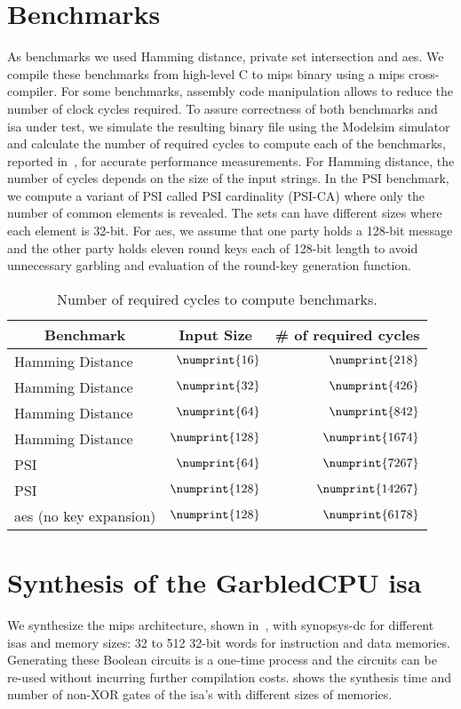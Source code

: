 \section{Benchmarks}\label{ssect:bench}
As benchmarks we used Hamming distance, private set intersection and \acrshort{aes}. We compile these benchmarks from high-level C to \gls{mips} binary using a \gls{mips} cross-compiler. For some benchmarks, assembly code manipulation allows to reduce the number of clock cycles required. To assure correctness of both benchmarks and \acrshort{isa} under test, we simulate the resulting binary file using the Modelsim simulator and calculate the number of required cycles to compute each of the benchmarks, reported in~, for accurate performance measurements. For Hamming distance, the number of cycles depends on the size of the input strings. In the PSI benchmark, we compute a variant of PSI called PSI cardinality (PSI-CA) where only the number of common elements is revealed. The sets can have different sizes where each element is 32-bit.  For \acrshort{aes}, we assume that one party holds a 128-bit message and the other party holds eleven round keys each of 128-bit length to avoid unnecessary garbling and evaluation of the round-key generation function.

\begin{table}[ht]
\caption{Number of required cycles to compute benchmarks.}\label{tab:cyc_bench}
\centering
\small
\begin{tabular}{l|r|r}
\multicolumn{1}{c|}{Benchmark} & \multicolumn{1}{c|}{Input Size} &  \multicolumn{1}{c}{\# of required cycles} \\
\hline
\hline
Hamming Distance & $\numprint{16}$ & $\numprint{218}$\\
\hline
 Hamming Distance & $\numprint{32}$ & $\numprint{426}$\\
\hline
Hamming Distance & $\numprint{64}$ & $\numprint{842}$\\
\hline
Hamming Distance & $\numprint{128}$ & $\numprint{1674}$\\
\hline
PSI & $\numprint{64}$ &$\numprint{7267}$\\
\hline
PSI & $\numprint{128}$ &$\numprint{14267}$\\
\hline
\acrshort{aes} (no key expansion) & $\numprint{128}$ & $\numprint{6178}$\\
\end{tabular}
\end{table}

\section{Synthesis of the GarbledCPU \acrshort{isa}}
We synthesize the \gls{mips} architecture, shown in~, with \gls{synopsys-dc} for different \acrshort{isa}s and memory sizes: 32 to 512 32-bit words for instruction and data memories. Generating these Boolean circuits is a one-time process and the circuits can be re-used without incurring further compilation costs.  shows the synthesis time and number of non-XOR gates of the \acrshort{isa}'s with different sizes of memories.

